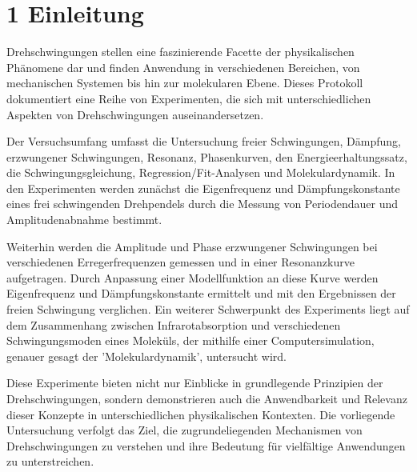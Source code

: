 \chapter*{1 Einleitung}
\setcounter{chapter}{1}
\setcounter{section}{0}
\setcounter{subsection}{0}

Drehschwingungen stellen eine faszinierende Facette der physikalischen Phänomene dar und finden Anwendung in verschiedenen Bereichen, von mechanischen Systemen bis hin zur molekularen Ebene. Dieses Protokoll dokumentiert eine Reihe von Experimenten, die sich mit unterschiedlichen Aspekten von Drehschwingungen auseinandersetzen.

Der Versuchsumfang umfasst die Untersuchung freier Schwingungen, Dämpfung, erzwungener Schwingungen, Resonanz, Phasenkurven, den Energieerhaltungssatz, die Schwingungsgleichung, Regression/Fit-Analysen und Molekulardynamik. In den Experimenten werden zunächst die Eigenfrequenz und Dämpfungskonstante eines frei schwingenden Drehpendels durch die Messung von Periodendauer und Amplitudenabnahme bestimmt.

Weiterhin werden die Amplitude und Phase erzwungener Schwingungen bei verschiedenen Erregerfrequenzen gemessen und in einer Resonanzkurve aufgetragen. Durch Anpassung einer Modellfunktion an diese Kurve werden Eigenfrequenz und Dämpfungskonstante ermittelt und mit den Ergebnissen der freien Schwingung verglichen. Ein weiterer Schwerpunkt des Experiments liegt auf dem Zusammenhang zwischen Infrarotabsorption und verschiedenen Schwingungsmoden eines Moleküls, der mithilfe einer Computersimulation, genauer gesagt der 'Molekulardynamik', untersucht wird.

Diese Experimente bieten nicht nur Einblicke in grundlegende Prinzipien der Drehschwingungen, sondern demonstrieren auch die Anwendbarkeit und Relevanz dieser Konzepte in unterschiedlichen physikalischen Kontexten. Die vorliegende Untersuchung verfolgt das Ziel, die zugrundeliegenden Mechanismen von Drehschwingungen zu verstehen und ihre Bedeutung für vielfältige Anwendungen zu unterstreichen.